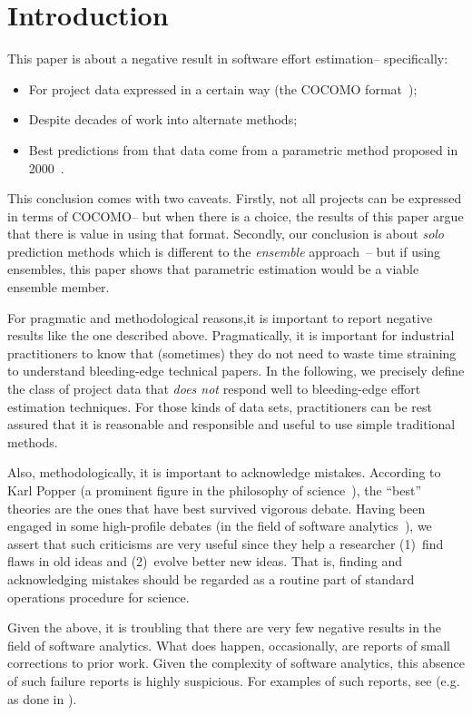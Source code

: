 \documentclass[smallcondesed]{svjour3}
\newcommand{\bi}{\begin{itemize}[leftmargin=0.4cm]}
\newcommand{\ei}{\end{itemize}}
\newenvironment{BLUE}{\color{black}}{\ignorespacesafterend}
\newcommand{\HERE}[1]{}
\begin{document}
\newpage
\section{Introduction}
This paper is about a negative result in software effort estimation-- specifically:
\bi
\item
For project data
expressed in a certain
way (the COCOMO format~\cite{boehm00b});
\item
Despite decades of work into 
alternate methods;
\item
Best predictions  from that data
come from a parametric  method proposed in 2000~\cite{boehm00b}.\ei
This conclusion comes with two
caveats. 
  Firstly, not all projects can be expressed in terms of COCOMO--
  but when there is a choice, the results
  of this paper argue that there is
  value in using that format.
Secondly, our conclusion is about {\em solo} prediction methods which is different to the  
{\em ensemble} approach~\cite{Minku2011,Minku2013,koc11a,Minku16b}-- but if using ensembles, this paper shows that parametric estimation would be   a viable  
 ensemble member.

For pragmatic and methodological reasons,it is important to report   negative results like the one described above. Pragmatically, it is important
for industrial practitioners to know that (sometimes) they do not need to waste time straining to understand  bleeding-edge technical papers. In the following, we precisely define the class of project data that {\em does not} respond well to  bleeding-edge 
effort estimation techniques.
For those kinds of data sets,   practitioners can be rest assured that it is reasonable and responsible and useful to use simple
traditional methods.

Also, methodologically, it is important to acknowledge mistakes. According to 
 Karl Popper (a prominent figure in the philosophy of science~\cite{popper63}), the ``best'' theories are  the ones that have best survived vigorous debate.  Having been engaged in some
 high-profile debates (in the field
of software analytics~\cite{me07e}), we assert that such criticisms are very  useful
since they help a researcher (1)~find flaws in old ideas and (2)~evolve better
new ideas. That is, finding and acknowledging mistakes should be regarded as a routine part of
standard operations procedure for science. 


 
\begin{BLUE}\HERE{Reviewer1a} 
Given the above, it is troubling  that 
there are very few negative results   in the field of software analytics. 
What does happen, occasionally,  are  reports of small
corrections to prior work. Given the complexity of software analytics, this absence of such failure reports is highly suspicious. For examples of such reports, see (e.g. as done in \cite{menzies13err,Murphy-Hill2012}).
\end{BLUE}
\end{document}
